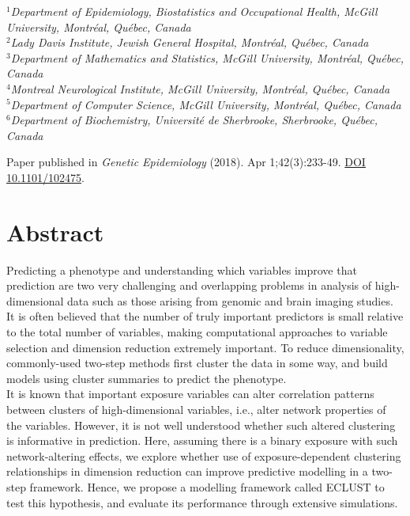 \begin{center}
$^{1}$\textit{Department of Epidemiology, Biostatistics and Occupational Health, McGill University, Montr\'{e}al, Qu\'{e}bec, Canada}\\
$^{2}$\textit{Lady Davis Institute, Jewish General Hospital, Montr\'{e}al, Qu\'{e}bec, Canada} \\
$^{3}$\textit{Department of Mathematics and Statistics, McGill University, Montr\'{e}al, Qu\'{e}bec, Canada}\\
$^{4}$\textit{Montreal Neurological Institute, McGill University, Montr\'{e}al, Qu\'{e}bec, Canada}\\
$^{5}$\textit{Department of Computer Science, McGill University, Montr\'{e}al, Qu\'{e}bec, Canada}\\
$^{6}$\textit{Department of Biochemistry, Universit\'{e} de Sherbrooke, Sherbrooke, Qu\'{e}bec, Canada}\\
\end{center}

\vspace*{1cm}

\begin{center}
Paper published in \textit{Genetic Epidemiology} (2018). Apr 1;42(3):233-49.  \href{https://doi.org/10.1101/102475}{DOI 10.1101/102475}.
\end{center}

\newpage

\section*{Abstract}

Predicting a phenotype and understanding which variables improve that prediction are two very challenging	and overlapping problems in analysis of high-dimensional data such as those arising from genomic and brain imaging studies. It is often believed that the number of truly important predictors is small relative to the total number of variables, making computational approaches to variable selection and dimension reduction extremely important. To reduce dimensionality, commonly-used two-step methods first cluster the data in some way, and build models using cluster summaries to predict the phenotype.\\

It is known that important exposure variables can alter correlation patterns between clusters of high-dimensional variables, i.e., alter network properties of the variables. However, it is not well understood whether such altered clustering is informative in prediction. Here, assuming there is a binary exposure with such network-altering effects, we explore whether use of exposure-dependent clustering relationships in dimension reduction can improve predictive modelling in a two-step framework. Hence, we propose a modelling framework called ECLUST to test this hypothesis, and evaluate its performance through extensive simulations.\\

